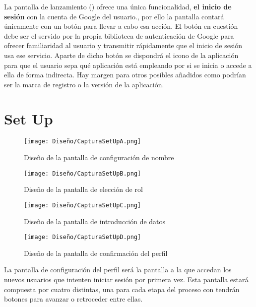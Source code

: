 La pantalla de lanzamiento () ofrece una única funcionalidad, \textbf{el inicio de sesión} con la cuenta de Google del usuario., por ello la pantalla contará únicamente con un botón para llevar a cabo esa acción. El botón en cuestión debe ser el servido por la propia biblioteca de autenticación de Google para ofrecer familiaridad al usuario y transmitir rápidamente que el inicio de sesión usa ese servicio. Aparte de dicho botón se dispondrá el icono de la aplicación para que el usuario sepa qué aplicación está empleando por si se inicia o accede a ella de forma indirecta. Hay margen para otros posibles añadidos como podrían ser la marca de registro o la versión de la aplicación.

\section{Set Up}

\begin{figure}[H]
    \centering
    \begin{minipage}{0.20\textwidth}
        \centering
        \texttt{[image: Diseño/CapturaSetUpA.png]}
        \caption{Diseño de la pantalla de configuración de nombre}
        \label{scr:setup_name}
    \end{minipage}\hfill
    \begin{minipage}{0.20\textwidth}
        \vspace{-18pt}
        \centering
        \texttt{[image: Diseño/CapturaSetUpB.png]}
        \caption{Diseño de la pantalla de elección de rol}
        \label{scr:setup_role}
    \end{minipage}\hfill
    \begin{minipage}{0.20\textwidth}
        \centering
        \texttt{[image: Diseño/CapturaSetUpC.png]}
        \caption{Diseño de la pantalla de introducción de datos}
        \label{scr:setup_contact}
    \end{minipage}\hfill
    \begin{minipage}{0.20\textwidth}
        \centering
        \texttt{[image: Diseño/CapturaSetUpD.png]}
        \caption{Diseño de la pantalla de confirmación del perfil}
        \label{scr:setup_confirmation}
    \end{minipage}\hfill
\end{figure}

La pantalla de configuración del perfil será la pantalla a la que accedan los nuevos usuarios que intenten iniciar sesión por primera vez. Esta pantalla estará compuesta por cuatro distintas, una para cada etapa del proceso con tendrán botones para avanzar o retroceder entre ellas. 

